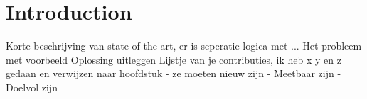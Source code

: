 \documentclass[11pt,a4paper]{report}
\begin{document}


\tableofcontents

\chapter{Introduction}
Korte beschrijving van state of the art, er is seperatie logica met ...
Het probleem met voorbeeld
Oplossing uitleggen
Lijstje van je contributies, ik heb x y en z gedaan en verwijzen naar hoofdstuk
- ze moeten nieuw zijn
- Meetbaar zijn
- Doelvol zijn





\printbibliography

\newpage
\mbox{}
\thispagestyle{empty}
\newpage
\mbox{}
\thispagestyle{empty}
\end{document}
